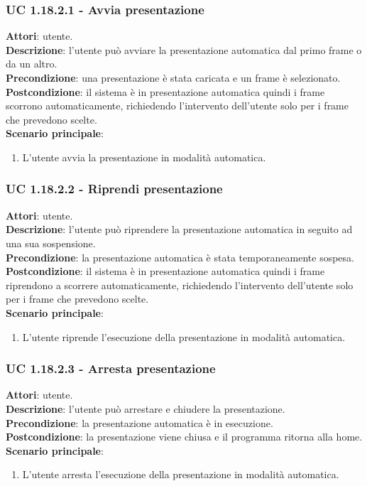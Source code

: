 	\subsubsection{UC 1.18.2.1 - Avvia presentazione}{
		\label{uc1.18.2.1}
		\textbf{Attori}: utente. \\
		\textbf{Descrizione}: l'utente può avviare la presentazione automatica dal primo frame o da un altro. \\
		\textbf{Precondizione}: una presentazione è stata caricata e un frame è selezionato.	\\
		\textbf{Postcondizione}: il sistema è in presentazione automatica quindi i frame scorrono automaticamente, richiedendo l'intervento dell'utente solo per i frame che prevedono scelte.	\\
		\textbf{Scenario principale}:
		\begin{enumerate}
			\item L'utente avvia la presentazione in modalità automatica.
		\end{enumerate}
	}
	\subsubsection{UC 1.18.2.2 - Riprendi presentazione}{
		\label{uc1.18.2.2}
		\textbf{Attori}: utente. \\
		\textbf{Descrizione}: l'utente può riprendere la presentazione automatica in seguito ad una sua sospensione. \\
		\textbf{Precondizione}: la presentazione automatica è stata temporaneamente sospesa.	\\
		\textbf{Postcondizione}: il sistema è in presentazione automatica quindi i frame riprendono a scorrere automaticamente, richiedendo l'intervento dell'utente solo per i frame che prevedono scelte.\\
		\textbf{Scenario principale}:
		\begin{enumerate}
			\item L'utente riprende l'esecuzione della presentazione in modalità automatica.
		\end{enumerate}		
	}
	\subsubsection{UC 1.18.2.3 - Arresta presentazione}{
		\label{uc1.18.2.3}
		\textbf{Attori}: utente. \\
		\textbf{Descrizione}: l'utente può arrestare e chiudere la presentazione. \\
		\textbf{Precondizione}: la presentazione automatica è in esecuzione.	\\
		\textbf{Postcondizione}: la presentazione viene chiusa e il programma ritorna alla home.\\
		\textbf{Scenario principale}:
		\begin{enumerate}
			\item L'utente arresta l'esecuzione della presentazione in modalità automatica.
		\end{enumerate}		
	}
